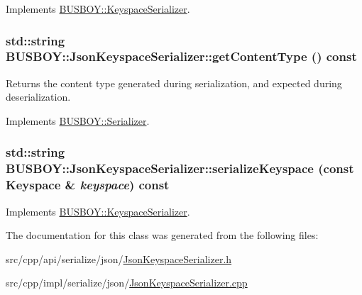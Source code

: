 Implements \hyperlink{classBUSBOY_1_1KeyspaceSerializer_a75f693a9b32f9b4b9f64d9087aeb7d9c}{BUSBOY::KeyspaceSerializer}.\hypertarget{classBUSBOY_1_1JsonKeyspaceSerializer_a3fb88c9ae3f198a5aba3ba8a69337f9c}{
\subsubsection[{getContentType}]{\setlength{\rightskip}{0pt plus 5cm}std::string BUSBOY::JsonKeyspaceSerializer::getContentType () const}}
\label{classBUSBOY_1_1JsonKeyspaceSerializer_a3fb88c9ae3f198a5aba3ba8a69337f9c}


Returns the content type generated during serialization, and expected during deserialization. 

Implements \hyperlink{classBUSBOY_1_1Serializer_aadfd0df50149a0c59424b5910c5ae3ef}{BUSBOY::Serializer}.\hypertarget{classBUSBOY_1_1JsonKeyspaceSerializer_a563aae12209fef1d370e7a6b9cde5fe8}{
\subsubsection[{serializeKeyspace}]{\setlength{\rightskip}{0pt plus 5cm}std::string BUSBOY::JsonKeyspaceSerializer::serializeKeyspace (const {\bf Keyspace} \& {\em keyspace}) const}}
\label{classBUSBOY_1_1JsonKeyspaceSerializer_a563aae12209fef1d370e7a6b9cde5fe8}


Implements \hyperlink{classBUSBOY_1_1KeyspaceSerializer_a90e8c692601fcd75cd94ccc1c06b7deb}{BUSBOY::KeyspaceSerializer}.

The documentation for this class was generated from the following files:\begin{DoxyCompactItemize}
\item 
src/cpp/api/serialize/json/\hyperlink{JsonKeyspaceSerializer_8h}{JsonKeyspaceSerializer.h}\item 
src/cpp/impl/serialize/json/\hyperlink{JsonKeyspaceSerializer_8cpp}{JsonKeyspaceSerializer.cpp}\end{DoxyCompactItemize}
